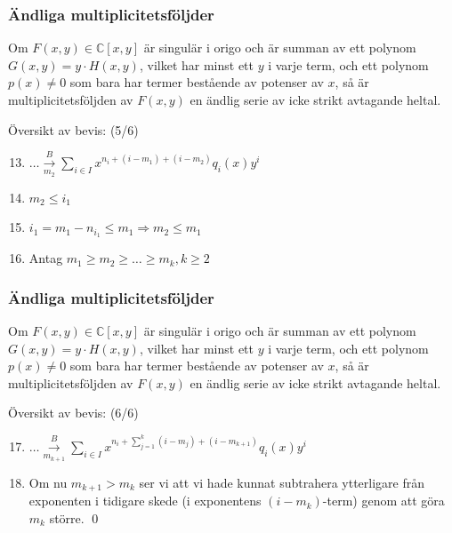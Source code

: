 \documentclass{beamer}
\begin{document}
\begin{frame}
	\frametitle{Ändliga multiplicitetsföljder}
	\begin{Theorem}
		Om $F(x,y)\in \mathbb{C}[x,y]$ är singulär i origo och är summan av ett polynom $G(x,y)=y\cdot H(x,y)$, vilket har minst ett $y$ i varje term, och ett polynom $p(x) \neq 0$ som bara har termer bestående av potenser av $x$, så är multiplicitetsföljden av $F(x,y)$ en ändlig serie av icke strikt avtagande heltal.
	\end{Theorem}
	
	Översikt av bevis: (5/6)
	\begin{enumerate}
		\setcounter{enumi}{12}
		\item $\ldots \overset{B}{\underset{m_2}{\longrightarrow}} \sum_{i\in I} x^{n_i+(i-m_1)+(i-m_2)}q_i(x)y^i$
		\item<2-> $m_2\leq i_1$
		\item<3-> $i_1=m_1-n_{i_1}\leq m_1 \Longrightarrow m_2\leq m_1$
		\item<4-> Antag $m_1\geq m_2 \geq \ldots \geq m_k, k \geq 2$
	\end{enumerate}
\end{frame}

\begin{frame}
	\frametitle{Ändliga multiplicitetsföljder}
	\begin{Theorem}
		Om $F(x,y)\in \mathbb{C}[x,y]$ är singulär i origo och är summan av ett polynom $G(x,y)=y\cdot H(x,y)$, vilket har minst ett $y$ i varje term, och ett polynom $p(x) \neq 0$ som bara har termer bestående av potenser av $x$, så är multiplicitetsföljden av $F(x,y)$ en ändlig serie av icke strikt avtagande heltal.
	\end{Theorem}
	
	Översikt av bevis: (6/6)
	\begin{enumerate}
		\setcounter{enumi}{16}
		\item $\ldots \overset{B}{\underset{m_{k+1}}{\longrightarrow}} \sum_{i\in I} x^{n_i+\sum_{j=1}^{k} (i-m_j) + (i-m_{k+1})}q_i(x)y^i$
		\item<2-> Om nu $m_{k+1}>m_k$ ser vi att vi hade kunnat subtrahera ytterligare från exponenten i tidigare skede (i exponentens $(i-m_k)$-term) genom att göra $m_k$ större.
		\qed
	\end{enumerate}
\end{frame}
\end{document}
